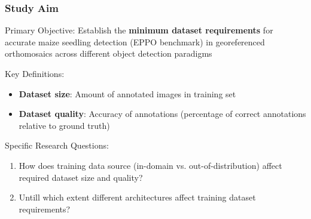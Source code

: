 \documentclass[aspectratio=43]{beamer}
\begin{document}
\begin{frame}
    \frametitle{Study Aim}
    
    \begin{exampleblock}{Primary Objective:}
        Establish the \textbf{minimum dataset requirements} for accurate maize seedling detection (EPPO benchmark) in georeferenced orthomosaics across different object detection paradigms
    \end{exampleblock}
    
    \begin{block}{Key Definitions:}
        \small
        \begin{itemize}
            \item \textbf{Dataset size}: Amount of annotated images in training set
            \item \textbf{Dataset quality}: Accuracy of annotations (percentage of correct annotations relative to ground truth)
        \end{itemize}
    \end{block}
    
    \begin{block}{Specific Research Questions:}
        \small
        \begin{enumerate}
            \item How does training data source (in-domain vs. out-of-distribution) affect required dataset size and quality?
            \item Untill which extent different architectures affect training dataset requirements?
        \end{enumerate}
    \end{block}
\end{frame}
\end{document}
